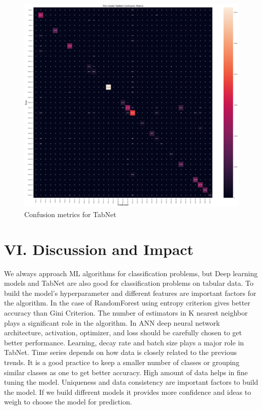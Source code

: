 \documentclass[conference,final,]{IEEEtran}
\begin{document}
\begin{figure}

{\centering \includegraphics[width=0.7\linewidth]{img/TabNet} 

}

\caption{Confusion metrics for TabNet}\label{fig:unnamed-chunk-15}
\end{figure}

\section{VI. Discussion and Impact}\label{vi.-discussion-and-impact}

We always approach ML algorithms for classification problems, but Deep
learning models and TabNet are also good for classification problems on
tabular data. To build the model's hyperparameter and different features
are important factors for the algorithm. In the case of RandomForest
using entropy criterion gives better accuracy than Gini Criterion. The
number of estimators in K nearest neighbor plays a significant role in
the algorithm. In ANN deep neural network architecture, activation,
optimizer, and loss should be carefully chosen to get better
performance. Learning, decay rate and batch size plays a major role in
TabNet. Time series depends on how data is closely related to the
previous trends. It is a good practice to keep a smaller number of
classes or grouping similar classes as one to get better accuracy. High
amount of data helps in fine tuning the model. Uniqueness and data
consistency are important factors to build the model. If we build
different models it provides more confidence and ideas to weigh to
choose the model for prediction.
\end{document}

